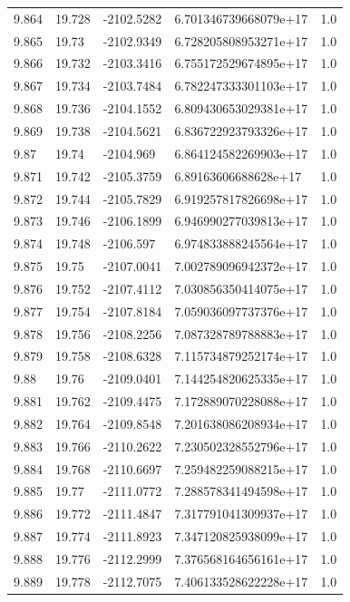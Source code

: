 \begin{tabular}{lllll}
9.864 & 19.728 & -2102.5282 & 6.701346739668079e+17 & 1.0 \\
9.865 & 19.73 & -2102.9349 & 6.728205808953271e+17 & 1.0 \\
9.866 & 19.732 & -2103.3416 & 6.755172529674895e+17 & 1.0 \\
9.867 & 19.734 & -2103.7484 & 6.782247333301103e+17 & 1.0 \\
9.868 & 19.736 & -2104.1552 & 6.809430653029381e+17 & 1.0 \\
9.869 & 19.738 & -2104.5621 & 6.836722923793326e+17 & 1.0 \\
9.87 & 19.74 & -2104.969 & 6.864124582269903e+17 & 1.0 \\
9.871 & 19.742 & -2105.3759 & 6.89163606688628e+17 & 1.0 \\
9.872 & 19.744 & -2105.7829 & 6.919257817826698e+17 & 1.0 \\
9.873 & 19.746 & -2106.1899 & 6.946990277039813e+17 & 1.0 \\
9.874 & 19.748 & -2106.597 & 6.974833888245564e+17 & 1.0 \\
9.875 & 19.75 & -2107.0041 & 7.002789096942372e+17 & 1.0 \\
9.876 & 19.752 & -2107.4112 & 7.030856350414075e+17 & 1.0 \\
9.877 & 19.754 & -2107.8184 & 7.059036097737376e+17 & 1.0 \\
9.878 & 19.756 & -2108.2256 & 7.087328789788883e+17 & 1.0 \\
9.879 & 19.758 & -2108.6328 & 7.115734879252174e+17 & 1.0 \\
9.88 & 19.76 & -2109.0401 & 7.144254820625335e+17 & 1.0 \\
9.881 & 19.762 & -2109.4475 & 7.172889070228088e+17 & 1.0 \\
9.882 & 19.764 & -2109.8548 & 7.201638086208934e+17 & 1.0 \\
9.883 & 19.766 & -2110.2622 & 7.230502328552796e+17 & 1.0 \\
9.884 & 19.768 & -2110.6697 & 7.259482259088215e+17 & 1.0 \\
9.885 & 19.77 & -2111.0772 & 7.288578341494598e+17 & 1.0 \\
9.886 & 19.772 & -2111.4847 & 7.317791041309937e+17 & 1.0 \\
9.887 & 19.774 & -2111.8923 & 7.347120825938099e+17 & 1.0 \\
9.888 & 19.776 & -2112.2999 & 7.376568164656161e+17 & 1.0 \\
9.889 & 19.778 & -2112.7075 & 7.406133528622228e+17 & 1.0 \\

\end{tabular}

